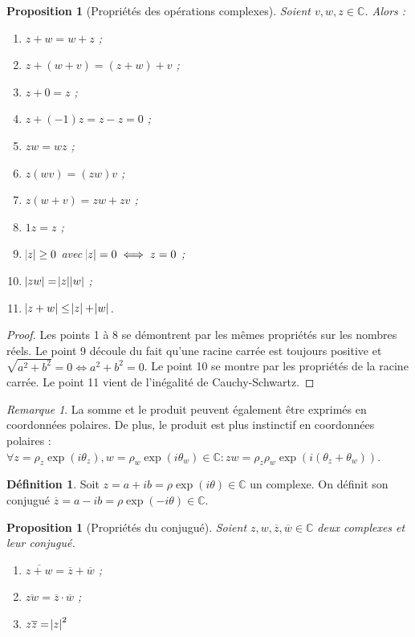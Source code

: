 \documentclass{article}
\newcommand{\C}{\mathbb C}
\newtheorem{prp}[thm]{Proposition}
\theoremstyle{definition}
\newtheorem{déf}[thm]{Définition}
\theoremstyle{remark}
\newtheorem*{rmq}{Remarque}
\begin{document}
		\begin{prp}[Propriétés des opérations complexes] Soient $v, w, z \in \C$. Alors :
		\begin{enumerate}
			\item $z+w = w+z$ ;
			\item $z+(w+v)=(z+w)+v$ ;
			\item $z+0 = z$ ;
			\item $z + (-1)z = z - z = 0$ ;
			\item $zw = wz$ ;
			\item $z(wv) = (zw)v$ ;
			\item $z(w+v) = zw + zv$ ;
			\item $1z = z$ ;
			\item $\abs{z} \geq 0$ avec $\abs z = 0 \iff z = 0$ ;
			\item $\abs{zw}  = \abs z\abs w$ ;
			\item $\abs{z+w} \leq \abs z + \abs w$.
		\end{enumerate}
		\end{prp}

		\begin{proof} Les points 1 à 8 se démontrent par les mêmes propriétés sur les nombres réels. Le point 9 découle du fait qu'une racine carrée est toujours positive
		et $\sqrt {a^2+b^2} = 0 \iff a^2+b^2 = 0$. Le point 10 se montre par les propriétés de la racine carrée. Le point 11 vient de l'inégalité de Cauchy-Schwartz.
		\end{proof}

		\begin{rmq} La somme et le produit peuvent également être exprimés en coordonnées polaires. De plus, le produit est plus instinctif en coordonnées polaires :
		$\forall z = \rho_z\exp(i\theta_z), w = \rho_w\exp(i\theta_w) \in \C : zw = \rho_z\rho_w\exp(i(\theta_z+\theta_w))$. \end{rmq}

		\begin{déf} Soit $z = a + ib = \rho\exp(i\theta) \in \C$ un complexe. On définit son conjugué $\overline z = a - ib = \rho\exp(-i\theta) \in \C$. \end{déf}

		\begin{prp}[Propriétés du conjugué] Soient $z, w, \overline z, \overline w \in \C$ deux complexes et leur conjugué.
		\begin{enumerate}
			\item $\overline {z+w} = \overline z + \overline w$ ;
			\item $\overline {zw} = \overline z\cdot\overline w$ ;
			\item $z\overline z = \abs z^2$
		\end{enumerate}
		\end{prp}
\end{document}
